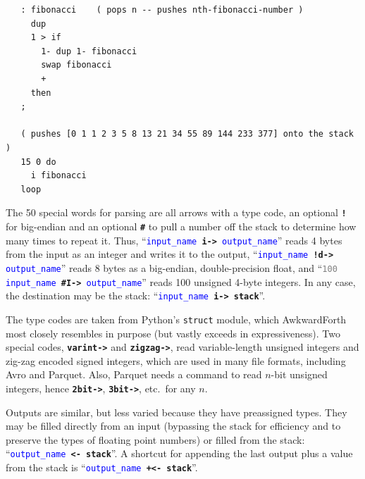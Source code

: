 \documentclass{webofc}
\begin{document}
\small
\begin{verbatim}
   : fibonacci    ( pops n -- pushes nth-fibonacci-number )
     dup
     1 > if
       1- dup 1- fibonacci
       swap fibonacci
       +
     then
   ;

   ( pushes [0 1 1 2 3 5 8 13 21 34 55 89 144 233 377] onto the stack )
   15 0 do
     i fibonacci
   loop
\end{verbatim}
\normalsize

The 50 special words for parsing are all arrows with a type code, an optional \textcolor{OliveGreen}{\tt\textbf{!}} for big-endian and an optional \textcolor{OliveGreen}{\tt\textbf{\#}} to pull a number off the stack to determine how many times to repeat it. Thus, ``{\tt \textcolor{blue}{input\_name} \textcolor{OliveGreen}{\textbf{i->}} \textcolor{blue}{output\_name}}'' reads 4 bytes from the input as an integer and writes it to the output, ``{\tt \textcolor{blue}{input\_name} \textcolor{OliveGreen}{\textbf{!d->}} \textcolor{blue}{output\_name}}'' reads 8 bytes as a big-endian, double-precision float, and ``{\tt \textcolor{gray}{100} \textcolor{blue}{input\_name} \textcolor{OliveGreen}{\textbf{\#I->}} \textcolor{blue}{output\_name}}'' reads 100 unsigned 4-byte integers. In any case, the destination may be the stack: ``{\tt \textcolor{blue}{input\_name} \textcolor{OliveGreen}{\textbf{i->}} \textcolor{OliveGreen}{\textbf{stack}}}''.

The type codes are taken from Python's \texttt{struct} module, which AwkwardForth most closely resembles in purpose (but vastly exceeds in expressiveness). Two special codes, \textcolor{OliveGreen}{\tt\textbf{varint->}} and \textcolor{OliveGreen}{\tt\textbf{zigzag->}}, read variable-length unsigned integers and zig-zag encoded signed integers, which are used in many file formats, including Avro and Parquet. Also, Parquet needs a command to read $n$-bit unsigned integers, hence \textcolor{OliveGreen}{\tt\textbf{2bit->}}, \textcolor{OliveGreen}{\tt\textbf{3bit->}}, etc.\ for any $n$.

Outputs are similar, but less varied because they have preassigned types. They may be filled directly from an input (bypassing the stack for efficiency and to preserve the types of floating point numbers) or filled from the stack: ``{\tt \textcolor{blue}{output\_name} \textcolor{OliveGreen}{\textbf{<-}} \textcolor{OliveGreen}{\textbf{stack}}}''. A shortcut for appending the last output plus a value from the stack is ``{\tt \textcolor{blue}{output\_name} \textcolor{OliveGreen}{\textbf{+<-}} \textcolor{OliveGreen}{\textbf{stack}}}''.
\end{document}

